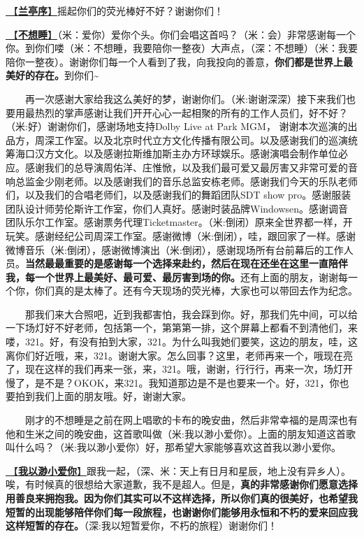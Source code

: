 \documentclass[]{ctexbook}
\begin{document}
\hyperref[lantingxu]{🎵【\textbf{兰亭序}】}摇起你们的荧光棒好不好？谢谢你们！

\hyperref[donot-want-to-sleep]{🎵【\textbf{不想睡}】}（米：爱你）爱你个头。你们会唱这首吗？（米：会）非常感谢每一个你。到你们喽（米：不想睡，我要陪你一整夜）大声点，（深：不想睡）（米：我要陪你一整夜）。谢谢你们每一个人看到了我，向我投向的善意，\textbf{你们都是世界上最美好的存在。}到你们\textasciitilde{}

  再一次感谢大家给我这么美好的梦，谢谢你们。（米:谢谢深深）接下来我们也要用最热烈的掌声感谢让我们开开心心一起相聚的所有的工作人员们，好不好？（米:好）谢谢你们，感谢场地支持Dolby Live at Park MGM， 谢谢本次巡演的出品方，周深工作室。以及北京时代立方文化传播有限公司。以及感谢我们的巡演统筹海口汉方文化。以及感谢拉斯维加斯主办方环球娱乐。感谢演唱会制作单位必应。感谢我们的总导演周佑洋、庄惟惞，以及我们最可爱又最厉害又非常可爱的音响总监金少刚老师。以及感谢我们的音乐总监安栋老师。感谢我们今天的乐队老师们，以及我们的合唱老师们，以及感谢我们的舞蹈团队SDT show pro。感谢服装团队设计师劳伦斯许工作室，你们人真好。感谢时装品牌Windowsen。感谢调音团队乐尔工作室。感谢票务代理Ticketmaster。（米:倒闭）原来全世界都一样，开玩笑。感谢经纪公司周深工作室。感谢微博（米:倒闭），哇，跟回家了一样。感谢微博音乐（米:倒闭），感谢微博演出（米:倒闭），感谢现场所有台前幕后的工作人员。\textbf{当然最最重要的是感谢每一个选择来赴约，然后在现在还坐在这里一直陪伴我，每一个世界上最美好、最可爱、最厉害到场的你。}还有上面的朋友，谢谢每一个你，你们真的是太棒了。还有今天现场的荧光棒，大家也可以带回去作为纪念。

  那我们来大合照吧，近到我都害怕，我会踩到你。好，那我们先中间，可以给一下场灯好不好老师，包括第一个，第第第一排，这个屏幕上都看不到清他们，来喽，321。好，有没有拍到大家，321。为什么叫我她们要笑，这边的朋友，哇，这离你们好近哦，来，321。谢谢大家。怎么回事？这里，老师再来一个，哦现在亮了，现在这样的我们再来一张，来，321。哦，谢谢，行行行，再来一次，场灯开慢了，是不是？OKOK，来321。我知道那边是不是也要来一个。好，321，你也要拍到我们上面的朋友哦。好，谢谢大家。

  刚才的不想睡是之前在网上唱歌的卡布的晚安曲，然后非常幸福的是周深也有他和生米之间的晚安曲，这首歌叫做（米:我以渺小爱你）。上面的朋友知道这首歌叫什么吗？（米:我以渺小爱你）好，那希望大家能够喜欢这首我以渺小爱你。

\hyperref[loving-you-in-my-humble-way]{🎵【\textbf{我以渺小爱你}】}跟我一起，（深、米：天上有日月和星辰，地上没有异乡人）。唉，有时候真的很想给大家道歉，我不是超人。但是，\textbf{真的非常感谢你们愿意选择用善良来拥抱我。因为你们其实可以不这样选择，所以你们真的很美好，也希望我短暂的出现能够陪伴你们每一段旅程，也谢谢你们能够用永恒和不朽的爱来回应我这样短暂的存在。}（深:我以短暂爱你，不朽的旅程）谢谢你们！
\end{document}
